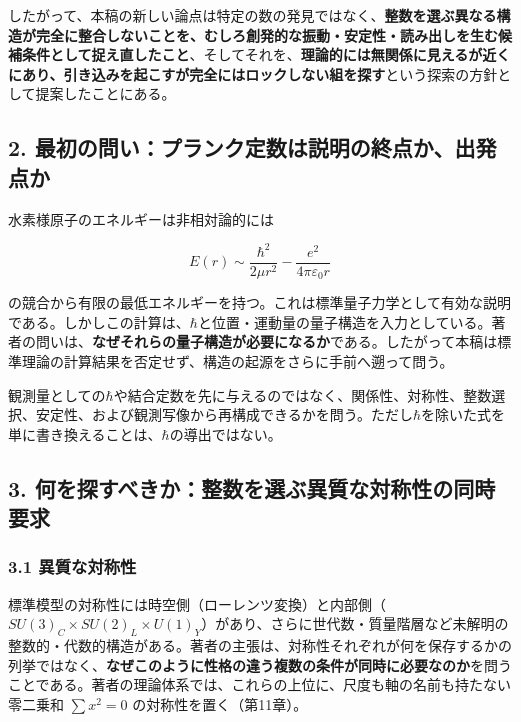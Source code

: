 \documentclass[
  a4paper,
]{ltjsarticle}
\begin{document}
したがって、本稿の新しい論点は特定の数の発見ではなく、\textbf{整数を選ぶ異なる構造が完全に整合しないことを、むしろ創発的な振動・安定性・読み出しを生む候補条件として捉え直したこと}、そしてそれを、\textbf{理論的には無関係に見えるが近くにあり、引き込みを起こすが完全にはロックしない組を探す}という探索の方針として提案したことにある。

\subsection{2.
最初の問い：プランク定数は説明の終点か、出発点か}\label{ux6700ux521dux306eux554fux3044ux30d7ux30e9ux30f3ux30afux5b9aux6570ux306fux8aacux660eux306eux7d42ux70b9ux304bux51faux767aux70b9ux304b}

水素様原子のエネルギーは非相対論的には

\[
E(r)\sim\frac{\hbar^2}{2\mu r^2}-\frac{e^2}{4\pi\varepsilon_0r}
\]

の競合から有限の最低エネルギーを持つ。これは標準量子力学として有効な説明である。しかしこの計算は、\(\hbar\)と位置・運動量の量子構造を入力としている。著者の問いは、\textbf{なぜそれらの量子構造が必要になるか}である。したがって本稿は標準理論の計算結果を否定せず、構造の起源をさらに手前へ遡って問う。

観測量としての\(\hbar\)や結合定数を先に与えるのではなく、関係性、対称性、整数選択、安定性、および観測写像から再構成できるかを問う。ただし\(\hbar\)を除いた式を単に書き換えることは、\(\hbar\)の導出ではない。

\subsection{3.
何を探すべきか：整数を選ぶ異質な対称性の同時要求}\label{ux4f55ux3092ux63a2ux3059ux3079ux304dux304bux6574ux6570ux3092ux9078ux3076ux7570ux8ceaux306aux5bfeux79f0ux6027ux306eux540cux6642ux8981ux6c42}

\subsubsection{3.1
異質な対称性}\label{ux7570ux8ceaux306aux5bfeux79f0ux6027}

標準模型の対称性には時空側（ローレンツ変換）と内部側（\(SU(3)_C\times SU(2)_L\times U(1)_Y\)）があり、さらに世代数・質量階層など未解明の整数的・代数的構造がある。著者の主張は、対称性それぞれが何を保存するかの列挙ではなく、\textbf{なぜこのように性格の違う複数の条件が同時に必要なのか}を問うことである。著者の理論体系では、これらの上位に、尺度も軸の名前も持たない零二乗和
\(\sum x^2=0\) の対称性を置く（第11章）。
\end{document}
